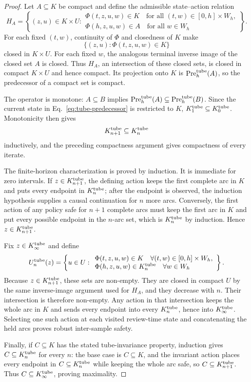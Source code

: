 \documentclass[11pt]{article}
\theoremstyle{definition}
\newcommand{\Pre}{\operatorname{Pre}}
\begin{document}
\begin{proof}
Let $A\subseteq K$ be compact and define the admissible state--action relation
\[
H_A=\left\{(z,u)\in K\times U:\begin{array}{l}
\Phi(t,z,u,w)\in K\quad\text{for all }(t,w)\in[0,h]\times W_h,\\
\Phi(h,z,u,w)\in A\quad\text{for all }w\in W_h
\end{array}\right\}.
\]
For each fixed $(t,w)$, continuity of $\Phi$ and closedness of $K$ make
\[
\{(z,u):\Phi(t,z,u,w)\in K\}
\]
closed in $K\times U$. For each fixed $w$, the analogous terminal inverse image of the closed set $A$ is closed. Thus $H_A$, an intersection of these closed sets, is closed in compact $K\times U$ and hence compact. Its projection onto $K$ is $\Pre_h^{\rm tube}(A)$, so the predecessor of a compact set is compact.

The operator is monotone: $A\subseteq B$ implies $\Pre_h^{\rm tube}(A)\subseteq\Pre_h^{\rm tube}(B)$. Since the current state in Eq.~\eqref{eq:tube-predecessor} is restricted to $K$, $K^{\rm tube}_1\subseteq K^{\rm tube}_0$. Monotonicity then gives
\[
K^{\rm tube}_{n+1}\subseteq K^{\rm tube}_n
\]
inductively, and the preceding compactness argument gives compactness of every iterate.

The finite-horizon characterization is proved by induction. It is immediate for zero intervals. If $z\in K^{\rm tube}_{n+1}$, the defining action keeps the first complete arc in $K$ and puts every endpoint in $K^{\rm tube}_n$; after the endpoint is observed, the induction hypothesis supplies a causal continuation for $n$ more arcs. Conversely, the first action of any policy safe for $n+1$ complete arcs must keep the first arc in $K$ and put every possible endpoint in the $n$-arc set, which is $K^{\rm tube}_n$ by induction. Hence $z\in K^{\rm tube}_{n+1}$.

Fix $z\in K^{\rm tube}_\infty$ and define
\[
U_n^{\rm tube}(z)=\left\{u\in U:\begin{array}{l}
\Phi(t,z,u,w)\in K\quad\forall(t,w)\in[0,h]\times W_h,\\
\Phi(h,z,u,w)\in K^{\rm tube}_n\quad\forall w\in W_h
\end{array}\right\}.
\]
Because $z\in K^{\rm tube}_{n+1}$, these sets are non-empty. They are closed in compact $U$ by the same inverse-image argument used for $H_A$, and they decrease with $n$. Their intersection is therefore non-empty. Any action in that intersection keeps the whole arc in $K$ and sends every endpoint into every $K^{\rm tube}_n$, hence into $K^{\rm tube}_\infty$. Selecting one such action at each visited review-time state and concatenating the held arcs proves robust inter-sample safety.

Finally, if $C\subseteq K$ has the stated tube-invariance property, induction gives $C\subseteq K^{\rm tube}_n$ for every $n$: the base case is $C\subseteq K$, and the invariant action places every endpoint in $C\subseteq K^{\rm tube}_n$ while keeping the whole arc safe, so $C\subseteq K^{\rm tube}_{n+1}$. Thus $C\subseteq K^{\rm tube}_\infty$, proving maximality.
\end{proof}
\end{document}
